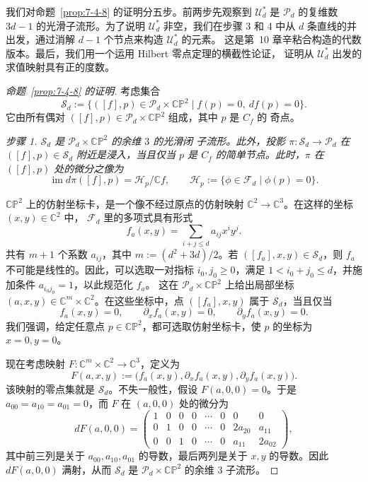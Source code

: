 我们对命题~\ref{prop:7-4-8} 的证明分五步。前两步先观察到 $\mathcal U_d^*$ 是
$\mathcal P_d$ 的复维数 $3d-1$ 的光滑子流形。为了说明 $\mathcal U_d^*$ 非空，我们在步骤
3 和 4 中从 $d$ 条直线的并出发，通过消解 $d-1$ 个节点来构造 $\mathcal U_d^*$ 的元素。
这是第~10 章辛粘合构造的代数版本。最后，我们用一个运用 Hilbert 零点定理的横截性论证，
证明从 $\mathcal U_d^*$ 出发的求值映射具有正的度数。

\begin{proof}[命题~\ref{prop:7-4-8} 的证明]
考虑集合
\[
  \mathcal S_d
  :=\bigl\{([f],p)\in\mathcal P_d\times\mathbb{CP}^2
  \mid f(p)=0,\ df(p)=0\bigr\}.
\]
它由所有偶对 $([f],p)\in\mathcal P_d\times\mathbb{CP}^2$ 组成，其中 $p$ 是 $C_f$ 的
奇点。

\emph{步骤 1. $\mathcal S_d$ 是 $\mathcal P_d\times\mathbb{CP}^2$ 的余维 $3$ 的光滑闭
子流形。此外，投影 $\pi:\mathcal S_d\to\mathcal P_d$ 在
$([f],p)\in\mathcal S_d$ 附近是浸入，当且仅当 $p$ 是 $C_f$ 的简单节点。此时，$\pi$ 在
$([f],p)$ 处的微分之像为}
\[
  \operatorname{im}d\pi([f],p)=\mathcal H_p/\mathbb C f,
  \qquad
  \mathcal H_p:=\bigl\{\phi\in\mathcal F_d\mid\phi(p)=0\bigr\}.
\]

$\mathbb{CP}^2$ 上的仿射坐标卡，是一个像不经过原点的仿射映射
$\mathbb C^2\to\mathbb C^3$。在这样的坐标 $(x,y)\in\mathbb C^2$ 中，
$\mathcal F_d$ 里的多项式具有形式
\[
  f_a(x,y)=\sum_{i+j\le d}a_{ij}x^iy^j.
\]
共有 $m+1$ 个系数 $a_{ij}$，其中 $m:=(d^2+3d)/2$。若
$([f_a],x,y)\in\mathcal S_d$，则 $f_a$ 不可能是线性的。因此，可以选取一对指标
$i_0,j_0\ge0$，满足 $1<i_0+j_0\le d$，并施加条件 $a_{i_0j_0}=1$，以此规范化 $f_a$。
这在 $\mathcal P_d\times\mathbb{CP}^2$ 上给出局部坐标
$(a,x,y)\in\mathbb C^m\times\mathbb C^2$。在这些坐标中，点
$([f_a],x,y)$ 属于 $\mathcal S_d$，当且仅当
\[
  f_a(x,y)=0,
  \qquad \partial_xf_a(x,y)=0,
  \qquad \partial_yf_a(x,y)=0.
\]
我们强调，给定任意点 $p\in\mathbb{CP}^2$，都可选取仿射坐标卡，使 $p$ 的坐标为
$x=0,y=0$。

现在考虑映射 $F:\mathbb C^m\times\mathbb C^2\to\mathbb C^3$，定义为
\[
  F(a,x,y):=\bigl(f_a(x,y),\partial_xf_a(x,y),\partial_yf_a(x,y)\bigr).
\]
该映射的零点集就是 $\mathcal S_d$。不失一般性，假设 $F(a,0,0)=0$。于是
$a_{00}=a_{10}=a_{01}=0$，而 $F$ 在 $(a,0,0)$ 处的微分为
\[
  dF(a,0,0)=
  \begin{pmatrix}
    1&0&0&0&\cdots&0&0&0\\
    0&1&0&0&\cdots&0&2a_{20}&a_{11}\\
    0&0&1&0&\cdots&0&a_{11}&2a_{02}
  \end{pmatrix},
\]
其中前三列是关于 $a_{00},a_{10},a_{01}$ 的导数，最后两列是关于 $x,y$ 的导数。因此
$dF(a,0,0)$ 满射，从而 $\mathcal S_d$ 是
$\mathcal P_d\times\mathbb{CP}^2$ 的余维 $3$ 子流形。


\end{proof}
